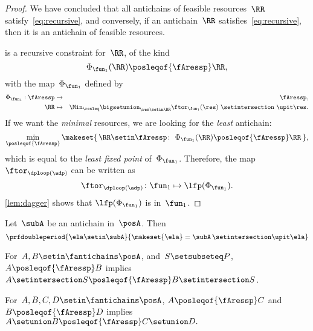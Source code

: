 \begin{proof}
    We have concluded that all antichains of feasible resources~$\RR$ satisfy~\cref{eq:recursive}, and conversely, if an antichain~$\RR$ satisfies~\cref{eq:recursive}, then it is an antichain of feasible resources.

     is a recursive constraint for~$\RR$, of the kind
    \begin{equation}
        \Phi_{\fun_{1}}(\RR)\posleqof{\fAressp}\RR,
    \end{equation}
    with the map~$\Phi_{\fun_{1}}$ defined by
    \begin{eqnarray}
        \Phi_{\fun_{1}}:\fAressp & \to     & \fAressp,\label{eq:bigphi} \\
        \RR                      & \mapsto & \Min_{\resleq}\bigsetunion_{\res\setin\RR}\ftor_{\fun_{1}}(\res)\ \setintersection\ \upit\res.\nonumber
    \end{eqnarray}
    If we want the \emph{minimal} resources, we are looking for the \emph{least} antichain:
    \begin{equation}
        \min_{\posleqof{\fAressp}}\makeset{\,\RR\setin\fAressp\colon\ \Phi_{\fun_{1}}(\RR)\posleqof{\fAressp}\RR\,},
    \end{equation}
    which is equal to the \emph{least fixed point }of~$\Phi_{\fun_{1}}$.
    Therefore, the map $\ftor_{\dploop(\adp)}$ can be written as
    \begin{equation}
        \ftor_{\dploop(\adp)}\colon\fun_{1}\mapsto\lfp(\Phi_{\fun_{1}}).
        \label{eq:loop_fixpoint}
    \end{equation}
    \cref{lem:dagger} shows that $\lfp(\Phi_{\fun_{1}})$ is \scottcontinuous in~$\fun_{1}$.
\end{proof}
\begin{lemma}
    \label{lem:antichain-write}
    Let~$\subA$ be an antichain in~$\posA$.
    Then
    \begin{equation}
        \prfdoubleperiod{
            \ela\setin \subA
        }{
            \makeset{\ela}=\subA\,\setintersection\upit \ela
        }
    \end{equation}
\end{lemma}

\begin{lemma}
    \label{lem:antichain_inter}
    For~$A,B\setin\fantichains\posA$, and~$S\setsubseteq P$,
    $A\posleqof{\fAressp}B$ implies $A\setintersection S\posleqof{\fAressp}B\setintersection S$.
\end{lemma}

\begin{lemma}
    \label{lem:antichain_union}
    For~$A,B,C,D\setin\fantichains\posA$, $A\posleqof{\fAressp}C$
    and $B\posleqof{\fAressp}D$ implies $A\setunion B\posleqof{\fAressp}C\setunion D.
    $
\end{lemma}

